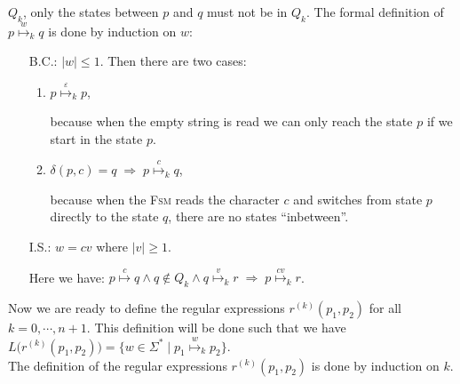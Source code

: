 $Q_k$, only the states between $p$ and $q$ must not be in $Q_k$.
The formal definition of $p \stackrel{w}{\mapsto}_k q$ is done by induction on  $w$:
\begin{enumerate}
\item[B.C.:] $|w| \leq 1$.  Then there are two cases:
  \begin{enumerate}
  \item $p \stackrel{\varepsilon}{\mapsto}_k p$,

        because when the empty string is read we can only reach the state $p$ if we start in the state $p$.
  \item $\delta(p, c) = q \;\Rightarrow\; p \stackrel{c}{\mapsto}_k q$,

        because when the \textsc{Fsm} reads the character $c$ and switches from state $p$ directly
        to the state $q$, there are no states ``inbetween''.
  \end{enumerate}
\item[I.S.:] $w = cv$ where $|v| \geq 1$.

             Here we have:
             \hspace*{1.3cm}
            $p \stackrel{c}{\mapsto} q \wedge q \not\in Q_k \wedge q \stackrel{v}{\mapsto}_k r
              \;\Rightarrow\; p \stackrel{cv}{\mapsto}_k r$.
\end{enumerate}
Now we are ready to define the regular expressions $r^{(k)}(p_1, p_2)$ for all $k=0,\cdots,n+1$.
This definition will be done such that we have
\\[0.2cm]
\hspace*{1.3cm}
$L\bigl(r^{(k)}(p_1, p_2)\bigr) = \bigl\{ w \in \Sigma^* \mid p_1 \stackrel{w}{\mapsto}_k p_2 \bigr\}$.
\\[0.2cm]
The definition of the regular expressions $r^{(k)}(p_1, p_2)$ is done by induction on $k$.
